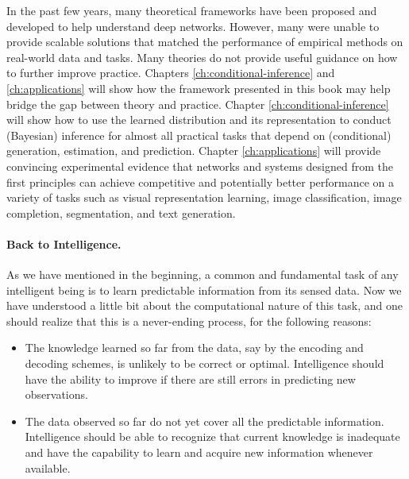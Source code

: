 \documentclass[../../book-main.tex]{subfiles}
\begin{document}
In the past few years, many theoretical frameworks have been proposed and developed to help understand deep networks. However, many were unable to provide scalable solutions that matched the performance of empirical methods on real-world data and tasks. Many theories do not provide useful guidance on how to further improve practice. Chapters \ref{ch:conditional-inference} and  \ref{ch:applications} will show how the framework presented in this book may help bridge the gap between theory and practice. Chapter \ref{ch:conditional-inference} will show how to use the learned distribution and its representation to conduct (Bayesian) inference for almost all practical tasks that depend on (conditional) generation, estimation, and prediction. Chapter \ref{ch:applications} will provide convincing experimental evidence that networks and systems designed from the first principles can achieve competitive and potentially better performance on a variety of tasks such as visual representation learning,  image classification, image completion, segmentation, and text generation.


\paragraph{Back to Intelligence.}
As we have mentioned in the beginning, a common and fundamental task of any intelligent being is to learn predictable information from its sensed data. Now we have understood a little bit about the computational nature of this task, and one should realize that this is a never-ending process, for the following reasons:
\begin{itemize}
    \item The knowledge learned so far from the data, say by the encoding and decoding schemes, is unlikely to be correct or optimal. Intelligence should have the ability to improve if there are still errors in predicting new observations. 
    \item The data observed so far do not yet cover all the predictable information. Intelligence should be able to recognize that current knowledge is inadequate and have the capability to learn and acquire new information whenever available.
\end{itemize}
\end{document}
